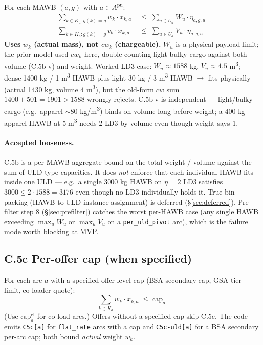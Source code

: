 \documentclass[11pt,a4paper]{article}
\theoremstyle{definition}
\begin{document}
For each MAWB $(a, g)$ with $a \in A^{\text{pu}}$:
\begin{align}
  \sum_{k \in K_a : g(k) = g} w_k \cdot x_{k,a}
    &\;\leq\; \sum_{u \in U_a} W_u \cdot \eta_{a,g,u}
    \tag{C.5b-w} \label{eq:C5b-w} \\
  \sum_{k \in K_a : g(k) = g} v_k \cdot x_{k,a}
    &\;\leq\; \sum_{u \in U_a} V_u \cdot \eta_{a,g,u}
    \tag{C.5b-v} \label{eq:C5b-v}
\end{align}
\textbf{Uses $w_k$ (actual mass), not $cw_k$ (chargeable).} $W_u$ is a
physical payload limit; the prior model used $cw_k$ here, double-counting
light-bulky cargo against both volume (C.5b-v) and weight. Worked LD3 case:
$W_u \approx 1588$ kg, $V_u \approx 4.5$ m\textsuperscript{3}; dense 1400 kg
/ 1 m\textsuperscript{3} HAWB plus light 30 kg / 3 m\textsuperscript{3} HAWB
$\to$ fits physically (actual 1430 kg, volume 4 m\textsuperscript{3}), but
the old-form $cw$ sum $1400 + 501 = 1901 > 1588$ wrongly rejects. C.5b-v is
independent --- light/bulky cargo (e.g.\ apparel $\sim 80$ kg/m\textsuperscript{3})
binds on volume long before weight; a 400 kg apparel HAWB at 5
m\textsuperscript{3} needs 2 LD3 by volume even though weight says 1.

\paragraph{Accepted looseness.}
C.5b is a per-MAWB aggregate bound on the total weight / volume against the
sum of ULD-type capacities. It does \emph{not} enforce that each individual
HAWB fits inside one ULD --- e.g.\ a single 3000 kg HAWB on $\eta = 2$ LD3
satisfies $3000 \leq 2 \cdot 1588 = 3176$ even though no LD3 individually
holds it. True bin-packing (HAWB-to-ULD-instance assignment) is deferred
(\S\ref{sec:deferred}). Pre-filter step 8 (\S\ref{sec:prefilter}) catches the
worst per-HAWB case (any single HAWB exceeding $\max_u W_u$ or $\max_u V_u$
on a \texttt{per\_uld\_pivot} arc), which is the failure mode worth blocking
at MVP.

\subsection*{C.5c Per-offer cap (when specified) }

For each arc $a$ with a specified offer-level cap (BSA secondary cap, GSA
tier limit, co-loader quote):
\begin{equation}
  \sum_{k \in K_a} w_k \cdot x_{k,a} \;\leq\; \text{cap}_a
  \label{eq:C5c}
\end{equation}
(Use $\text{cap}_a^{\text{cl}}$ for co-load arcs.) Offers without a specified
cap skip C.5c. The code emits \texttt{C5c[a]} for \texttt{flat\_rate} arcs with a cap and
\texttt{C5c-uld[a]} for a BSA secondary per-arc cap; both bound \emph{actual} weight $w_k$.
\end{document}
